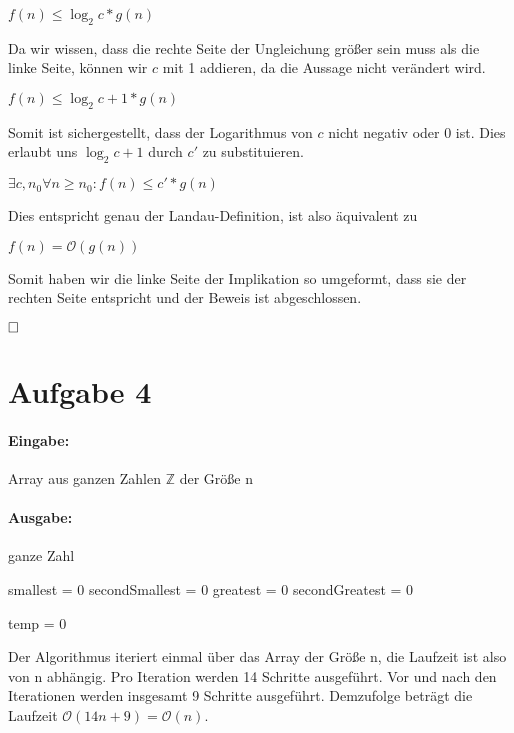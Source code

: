 \documentclass[12pt]{scrartcl}%
\theoremstyle{nonumberplain}
\newcommand{\bO}[1]{\mathcal O(#1)}
\begin{document}
$ f(n) \le \log_{2}{c} * g(n) $

Da wir wissen, dass die rechte Seite der Ungleichung größer sein muss als die linke Seite, können wir $c$ mit 1 addieren, da die Aussage nicht verändert wird.

$ f(n) \le \log_{2}{c+1} * g(n) $

Somit ist sichergestellt, dass der Logarithmus von $c$ nicht negativ oder $0$ ist. Dies erlaubt uns $\log_{2}{c+1}$ durch $c'$ zu substituieren.

$ \exists c,n_0 \forall n \ge n_0: f(n) \le c' * g(n)$

Dies entspricht genau der Landau-Definition, ist also äquivalent zu

$ f(n) = \bO{g(n)}$

Somit haben wir die linke Seite der Implikation so umgeformt, dass sie der rechten Seite entspricht und der Beweis ist abgeschlossen.

$\hfill \square$

\newpage

\section*{Aufgabe 4}

\paragraph{Eingabe:} Array aus ganzen Zahlen $\mathbb{Z}$ der Größe n

\paragraph{Ausgabe:} ganze Zahl

\begin{algorithm}[H]
	
	smallest = 0\;
	secondSmallest = 0\;
	greatest = 0\;
	secondGreatest = 0\;
	
	temp = 0\;
	

\end{algorithm}

\vspace{0.3cm}

Der Algorithmus iteriert einmal über das Array der Größe n, die Laufzeit ist also von n abhängig. Pro Iteration werden 14 Schritte ausgeführt. Vor und nach den Iterationen werden insgesamt 9 Schritte ausgeführt. Demzufolge beträgt die Laufzeit $\mathcal{O}(14n+9) = \mathcal{O}(n)$.
\end{document}
